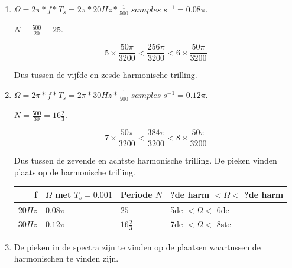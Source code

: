 \documentclass[10pt,a4paper]{article}
\begin{document}
\begin{enumerate}
    \item $ \Omega = 2\pi * f * T_s = 2\pi * 20 Hz * \frac{1}{500} \; samples
        \; s^{-1} = 0.08 \pi $.

    \noindent $ N = \frac{500}{20} = 25 $.

    \[ 5 \times \frac{50 \pi}{3200} < \frac{256 \pi}{3200} < 6 \times
    \frac{50 \pi}{3200} \]

    \noindent Dus tussen de vijfde en zesde harmonische trilling.

    \item $ \Omega = 2\pi * f * T_s = 2\pi * 30 Hz * \frac{1}{500} \; samples
        \; s^{-1} = 0.12 \pi  $.

    \noindent $ N = \frac{500}{30} = 16\frac{2}{3} $.

    \[ 7 \times \frac{50 \pi}{3200} < \frac{384 \pi}{3200} < 8 \times
    \frac{50 \pi}{3200} \]

    \noindent Dus tussen de zevende en achtste harmonische trilling.
    De pieken vinden plaats op de harmonische trilling.\\

    \begin{tabular}{|r|l|l|l|} \hline
        f & $\Omega$ met $T_s = 0.001$  & Periode $N$ & ?de harm $< \Omega<$ ?de
        harm \\ \hline
        $20 Hz$ & $0.08\pi$ & $25$ & 5de $< \Omega <$ 6de \\ \hline
        $30 Hz$ & $0.12\pi$ & $16\frac{2}{3}$ & 7de $< \Omega <$ 8ste \\ \hline 
    \end{tabular}
    \item De pieken in de spectra zijn te vinden op de plaatsen waartussen de harmonischen te vinden zijn.


\end{enumerate}
\end{document}
